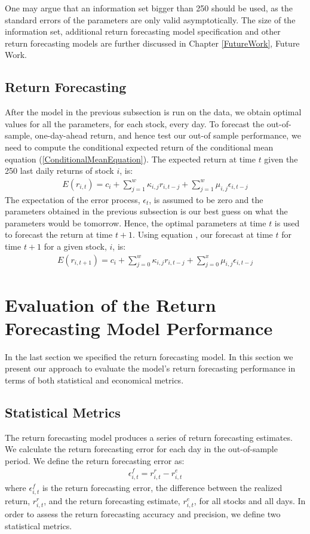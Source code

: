 One may argue that an information set bigger than 250 should be used, as the standard errors of the parameters are only valid asymptotically. The size of the information set, additional return forecasting model specification and other return forecasting models are further discussed in Chapter \ref{FutureWork}, Future Work.


\subsection{Return Forecasting}

After the model in the previous subsection is run on the data, we obtain optimal values for all the parameters, for each stock, every day. To forecast the out-of-sample, one-day-ahead return, and hence test our out-of sample performance, we need to compute the conditional expected return of the conditional mean equation (\ref{ConditionalMeanEquation}). The expected return at time $t$ given the 250 last daily returns of stock $i$, is:
\begin{align} 
    E(r_{i,t})=c_i+\sum_{j=1}^w\kappa_{i,j} r_{i,t-j}+\sum_{j=1}^w\mu_{i,j} \epsilon_{i,t-j} \label{ExpectedConditionalMean}
\end{align}
The expectation of the error process, $\epsilon_t$, is assumed to be zero and the parameters obtained in the previous subsection is our best guess on what the parameters would be tomorrow. Hence, the optimal parameters at time $t$ is used to forecast the return at time $t+1$. Using equation \label{ExpectedConditionalMean}, our forecast at time $t$ for time $t+1$ for a given stock, $i$, is:
\begin{align} 
    E(r_{i,t+1})=c_i+\sum_{j=0}^w\kappa_{i,j} r_{i,t-j}+\sum_{j=0}^x\mu_{i,j} \epsilon_{i,t-j}
\end{align}

\section{Evaluation of the Return Forecasting Model Performance}
In the last section we specified the return forecasting model. In this section we present our approach to evaluate the model's return forecasting performance in terms of both statistical and economical metrics. 

\subsection{Statistical Metrics}
The return forecasting model produces a series of return forecasting estimates. We calculate the return forecasting error for each day in the out-of-sample period. We define the return forecasting error as:
\begin{align}
    \epsilon_{i,t}^{f} = r_{i,t}^{r} - r_{i,t}^{e}
\end{align}
where $\epsilon_{i,t}^{f}$ is the return forecasting error, the difference between the realized return, $r_{i,t}^{r}$, and the return forecasting estimate, $r_{i,t}^{e}$, for all stocks and all days. In order to assess the return forecasting accuracy and precision, we define two statistical metrics. 

